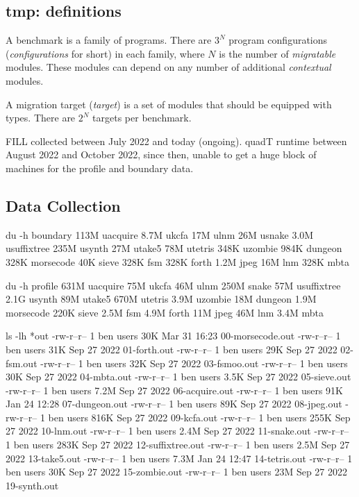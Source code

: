


\subsection{tmp: definitions}

A benchmark is a family of programs.
There are $3^N$ program configurations (\emph{configurations} for short)
in each family, where $N$ is the number of \emph{migratable} modules.
These modules can depend on any number of additional \emph{contextual} modules.

A migration target (\emph{target}) is a set of modules that should be equipped
with types.
There are $2^N$ targets per benchmark.

FILL collected between July 2022 and today (ongoing).
quadT runtime between August 2022 and October 2022, since then, unable to get a huge
block of machines for the profile and boundary data.



\subsection{Data Collection}

du -h boundary
113M	uacquire
8.7M	ukcfa
17M	ulnm
26M	usnake
3.0M	usuffixtree
235M	usynth
27M	utake5
78M	utetris
348K	uzombie
984K	dungeon
328K	morsecode
40K	sieve
328K	fsm
328K	forth
1.2M	jpeg
16M	lnm
328K	mbta

du -h profile
631M	uacquire
75M	ukcfa
46M	ulnm
250M	snake
57M	usuffixtree
2.1G	usynth
89M	utake5
670M	utetris
3.9M	uzombie
18M	dungeon
1.9M	morsecode
220K	sieve
2.5M	fsm
4.9M	forth
11M	jpeg
46M	lnm
3.4M	mbta

ls -lh *out
-rw-r--r-- 1 ben users  30K Mar 31 16:23 00-morsecode.out
-rw-r--r-- 1 ben users  31K Sep 27  2022 01-forth.out
-rw-r--r-- 1 ben users  29K Sep 27  2022 02-fsm.out
-rw-r--r-- 1 ben users  32K Sep 27  2022 03-fsmoo.out
-rw-r--r-- 1 ben users  30K Sep 27  2022 04-mbta.out
-rw-r--r-- 1 ben users 3.5K Sep 27  2022 05-sieve.out
-rw-r--r-- 1 ben users 7.2M Sep 27  2022 06-acquire.out
-rw-r--r-- 1 ben users  91K Jan 24 12:28 07-dungeon.out
-rw-r--r-- 1 ben users  89K Sep 27  2022 08-jpeg.out
-rw-r--r-- 1 ben users 816K Sep 27  2022 09-kcfa.out
-rw-r--r-- 1 ben users 255K Sep 27  2022 10-lnm.out
-rw-r--r-- 1 ben users 2.4M Sep 27  2022 11-snake.out
-rw-r--r-- 1 ben users 283K Sep 27  2022 12-suffixtree.out
-rw-r--r-- 1 ben users 2.5M Sep 27  2022 13-take5.out
-rw-r--r-- 1 ben users 7.3M Jan 24 12:47 14-tetris.out
-rw-r--r-- 1 ben users  30K Sep 27  2022 15-zombie.out
-rw-r--r-- 1 ben users  23M Sep 27  2022 19-synth.out



